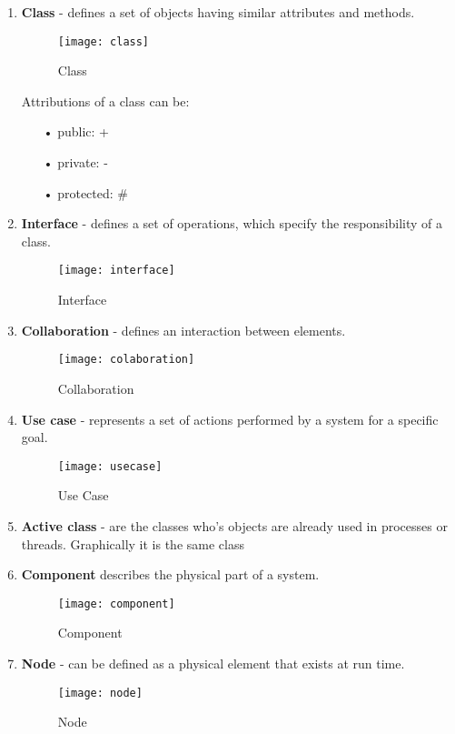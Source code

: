 \begin{enumerate}
\item \textbf{Class} - defines a set of objects having similar attributes and methods.
\begin{figure}[h]
\centering
\texttt{[image: class]}
\caption{Class}
\end{figure}
\par
\noindent
Attributions of a class can be:
\begin{enumerate}
		\item[•] public: +
    	\item[•] private: - 
    	\item[•] protected: \#
\end{enumerate} \par
\item \textbf{Interface} - defines a set of operations, which specify the responsibility of a class.
\begin{figure}[h]
\centering
\texttt{[image: interface]}
\caption{Interface}
\end{figure}\newpage
\item \textbf{Collaboration} - defines an interaction between elements.
\begin{figure}[h]
\centering
\texttt{[image: colaboration]}
\caption{Collaboration}
\end{figure}
\item \textbf{Use case} - represents a set of actions performed by a system for a specific goal.
\begin{figure}[h]
\centering
\texttt{[image: usecase]}
\caption{Use Case}
\end{figure}
\item \textbf{Active class} - are the classes who's objects are already used in processes or threads. Graphically it is the same class
\item \textbf{Component} describes the physical part of a system.
\begin{figure}[h]
\centering
\texttt{[image: component]}
\caption{Component}
\end{figure}
\item \textbf{Node} - can be defined as a physical element that exists at run time.
\begin{figure}[h!]
\centering
\texttt{[image: node]}
\caption{Node}
\end{figure}
\end{enumerate}

